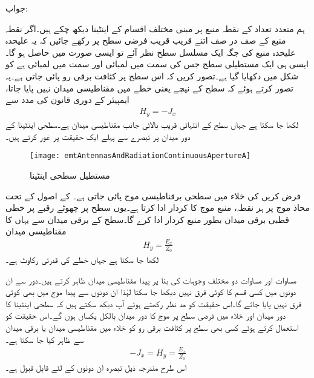 جواب:

ہم متعدد تعداد کے نقطہ منبع پر مبنی مختلف اقسام کے اینٹینا دیکھ چکے ہیں۔اگر نقطہ منبع کے صف در صف اتنے قریب قریب فرضی سطح پر رکھے جائیں کہ یہ علیحدہ علیحدہ منبع کی جگہ ایک مسلسل سطح نظر آئے تو ایسی صورت میں  حاصل ہو گا۔ایسی ہی ایک مستطیلی سطح جس کی  سمت میں لمبائی  اور  سمت میں لمبائی  ہے کو شکل  میں دکھایا گیا ہے۔تصور کریں کہ اس سطح پر  کثافت برقی رو پائی جاتی ہے۔یہ تصور کرتے ہوئے کہ سطح کے نیچے یعنی  خطے میں مقناطیسی میدان نہیں پایا جاتا، ایمپیئر کے دوری قانون کی مدد سے 
\begin{align}\label{مساوات_اینٹینا_فرضی_کثافت_رو}
H_y=-J_x
\end{align}
لکھا جا سکتا ہے جہاں  سطح کے انتہائی قریب بالائی جانب مقناطیسی میدان ہے۔سطحی اینٹینا کے دور میدان پر تبصرے سے پہلے ایک حقیقت پر غور کرتے ہیں۔

\begin{figure}
\centering
\texttt{[image: emtAntennasAndRadiationContinuousApertureA]}
\caption{مستطیل سطحی اینٹینا}
\label{شکل_اینٹینا_مستطیل_سطحی}
\end{figure}

فرض کریں کی  خلاء میں سطحی برقناطیسی موج پائی جاتی ہے۔ کے اصول کے تحت محاذ موج پر ہر نقطہ، منبع موج کا کردار ادا کرتا ہے۔یوں سطح پر چھوٹے رقبے   پر خطی قطبی برقی میدان  بطور منبع کردار ادا کرے گا۔سطح کے برقی میدان  سے یہاں کا مقناطیسی میدان
\begin{align}\label{مساوات_اینٹینا_فرضی_مقناطیسی_میدان}
H_y=\frac{E_x}{Z_0}
\end{align}
لکھا جا سکتا ہے جہاں  خطے کی قدرتی رکاوٹ  ہے۔

مساوات  اور مساوات  دو مختلف وجوہات کی بنا پر پیدا مقناطیسی میدان ظاہر کرتے ہیں۔دور سے ان دونوں میں کسی قسم کا کوئی فرق نہیں دیکھا جا سکتا لہٰذا ان دونوں سے پیدا موج میں بھی کوئی فرق نہیں پایا جائے گا۔اس حقیقت کو مد نظر رکھتے ہوئے  آپ دیکھ سکتے ہیں کہ سطحی اینٹینا کا دور میدان اور  خلاء میں فرضی سطح پر موج کا دور میدان بالکل یکساں ہوں گے۔اس حقیقت کو استعمال کرتے ہوئے کسی بھی سطح پر کثافت برقی رو  کو  خلاء میں مقناطیسی میدان  یا برقی میدان  سے ظاہر کیا جا سکتا ہے۔
\begin{align}\label{مساوات_اینٹینا_حقیقی_اور_فرضی}
-J_x=H_y=\frac{E_x}{Z_0}
\end{align}
اس طرح مندرجہ ذیل تبصرہ ان دونوں کے لئے قابل قبول ہے۔

